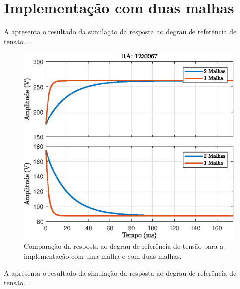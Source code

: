 \section{Implementação com duas malhas}






A  apresenta o resultado da simulação da resposta ao degrau de referência de tensão....

\begin{figure}[!ht]
	\centering
	\includegraphics[width=0.9\linewidth]{Figs/Buck-BoostStepResponse2malhas}
	\caption{Comparação da resposta ao degrau de referência de tensão para a implementação com uma malha e com duas malhas.}
	\label{fig:Buck-BoostStepResponse2malhas}
\end{figure}


A  apresenta o resultado da simulação da resposta ao degrau de referência de tensão....

